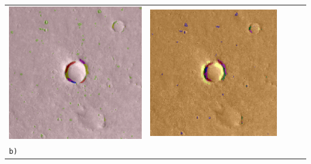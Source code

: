 \begin{table}[h!]
\begin{tabularx}{\textwidth}{>{\centering}m{}
			>{\centering}m{}
			>{\centering}m{}
			>{\centering}m{}
			>{\centering\arraybackslash}m{}}
		\includegraphics[width=0.9\linewidth]{images/gen/pooling_layers/p03_01.png_2.png} &
		\includegraphics[width=0.9\linewidth]{images/gen/pooling_layers/p03_01.png_4.png} \\
		\texttt{b)} &

\end{tabularx}
\end{table}
